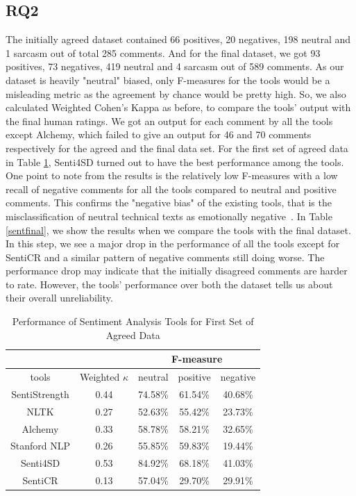 \subsection{RQ2}
The initially agreed dataset contained 
66 positives, 20 negatives, 198 neutral and 1 sarcasm 
out of total 285 comments. 
And for the final dataset, 
we got 93 positives, 73 negatives, 419 neutral and 4 sarcasm 
out of 589 comments. 
As our dataset is heavily "neutral" biased, 
only F-measures for the tools would be a misleading metric 
as the agreement by chance would be pretty high. 
So, we also calculated Weighted Cohen's Kappa as before, 
to compare the tools' output with the final human ratings. 
We got an output for each comment by all the tools except Alchemy, which failed to give an output for 46 and 70 comments respectively for the agreed and the final data set. 
For the first set of agreed data in Table \ref{sentfirst}, 
Senti4SD turned out to have the best performance among the tools. 
One point to note from the results is 
the relatively low F-measures with a low recall 
of negative comments 
for all the tools compared to 
neutral and positive comments. 
This confirms the "negative bias" of the existing tools, 
that is the misclassification of neutral technical texts 
as emotionally negative~\cite{blaz2016sentiment,novielli2015challenges,calefato2017sentiment}.
In Table \ref{sentfinal}, we show the results 
when we compare the tools with the final dataset. 
In this step, 
we see a major drop in the performance 
of all the tools 
except for SentiCR
and a similar pattern of negative comments 
still doing worse.
The performance drop may indicate
that the initially disagreed comments
are harder to rate.
However, the tools' performance 
over both the dataset 
tells us about their overall unreliability.


\vspace{3mm}
\noindent{}

\begin{table}
\centering
\caption{Performance of Sentiment Analysis Tools for First Set of  Agreed Data}
\label{sentfirst}
\begin{tabular}{|c|c|c|c|c|}
\hline
\multicolumn{2}{|c|}{ } & \multicolumn{3}{c|}{ F-measure } \\
\hline
tools & Weighted $\kappa$ & neutral & positive & negative \\
\hline
SentiStrength & 0.44 & 74.58\% & 61.54\% & 40.68\% \\
\hline
NLTK & 0.27 & 52.63\% & 55.42\% & 23.73\% \\
\hline
Alchemy & 0.33 & 58.78\% & 58.21\% & 32.65\% \\
\hline
Stanford NLP & 0.26 & 55.85\% & 59.83\% & 19.44\% \\
\hline
Senti4SD & 0.53 & 84.92\% & 68.18\% & 41.03\% \\
\hline
SentiCR & 0.13 & 57.04\% & 29.70\% & 29.91\% \\
\hline
\end{tabular}
\end{table}


